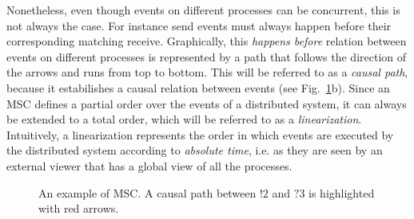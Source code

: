 Nonetheless, even though events on different processes can be concurrent, this is not always the case. For instance send events must always happen before their corresponding matching receive. Graphically, this \emph{happens before} relation between events on different processes is represented by a path that follows the direction of the arrows and runs from top to bottom. This will be referred to as a \emph{causal path}, because it estabilishes a causal relation between events (see Fig.~\ref{fig:msc_ex}b). 
Since an MSC defines a partial order over the events of a distributed system, it can always be extended to a total order, which will be referred to as a \emph{linearization}. 
Intuitively, a linearization represents the order in which events are executed by the distributed system according to \emph{absolute time}, i.e. as they are seen by an external viewer that has a global view of all the processes. 

\begin{figure}[t]
	\begin{center}
		\caption{An example of MSC. A causal path between $!2$ and $?3$ is highlighted with red arrows.}
		\label{fig:msc_ex}
	\end{center}
\end{figure}

